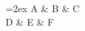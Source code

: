 \documentclass[nofonts]{ctexart}
\begin{document}
\xymatrix@R=2ex{
	A \ar[drr]	& B	& C	\\
	D			& E	& F	\\
}
\end{document}
